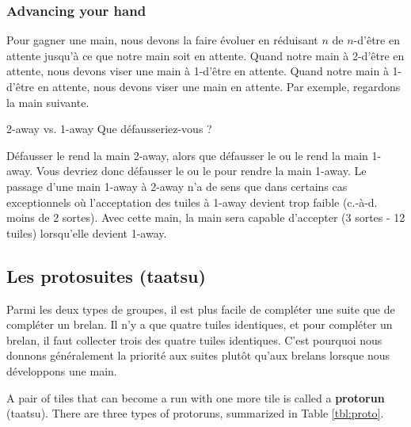 {\subsubsection{Advancing your hand}

Pour gagner une main, nous devons la faire évoluer en réduisant $n$ de $n$-d'être en attente jusqu'à ce que notre main soit en attente.
Quand notre main à 2-d'être en attente, nous devons viser une main à 1-d'être en attente. 
Quand notre main à 1-d'être en attente, nous devons viser une main en attente.
Par exemple, regardons la main suivante. 
\begin{itembox}[r]{2-away vs. 1-away}
\bp
{}\fa\fa\fa
\ep
\vspace{-10pt}Que défausseriez-vous ? \vspace{-5pt}
\end{itembox}
\noindent
Défausser le {\LARGE{}} rend la main 2-away, alors que défausser le {\LARGE{}} ou le {\LARGE{}} rend la main 1-away. Vous devriez donc défausser le {\LARGE{}} ou le {\LARGE{}} pour rendre la main 1-away. 
Le passage d'une main 1-away à 2-away n'a de sens que dans certains cas exceptionnels où l'acceptation des tuiles à 1-away devient trop faible (c.-à-d. moins de 2 sortes).
Avec cette main, la main sera capable d'accepter {\LARGE{}} (3 sortes - 12 tuiles) lorsqu'elle devient 1-away.

\subsection{Les protosuites ({\jap taatsu})} \label{sec:protorun}
	 
	  

Parmi les deux types de groupes, il est plus facile de compléter une suite que de compléter un brelan. Il n'y a que quatre tuiles identiques, et pour compléter un brelan, il faut collecter trois des quatre tuiles identiques. 
C'est pourquoi nous donnons généralement la priorité aux suites plutôt qu'aux brelans lorsque nous développons une main. 

\bigskip
A pair of tiles that can become a run with one more tile is called a {\bf protorun} ({\jap taatsu}). There are three types of protoruns, summarized in Table \ref{tbl:proto}. 
\bigskip

}
